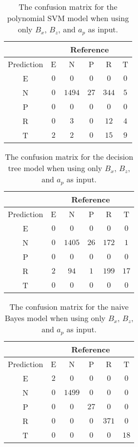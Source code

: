 \begin{table}[!ht]
	\centering
	\begin{tabular}{|c|c|c|c|c|c|}
		\hline
		 & \multicolumn{5}{|c|}{Reference} \\ \hline
		 Prediction & E & N & P & R & T \\ \hline
		 E & $0$ & $0$ & $0$ & $0$ & $0$ \\ \hline
		 N & $0$ & $1494$ & $27$ & $344$ & $5$ \\ \hline
		 P & $0$ & $0$ & $0$ & $0$ & $0$ \\ \hline
		 R & $0$ & $3$ & $0$ & $12$ & $4$ \\ \hline
		 T & $2$ & $2$ & $0$ & $15$ & $9$ \\ \hline
	\end{tabular}
	\caption{The confusion matrix for the polynomial SVM model when using only $B_{x}$, $B_{z}$, and $a_{p}$ as input.}
	\label{tab:cm:xzap:svmPoly}
\end{table}

\begin{table}[!ht]
	\centering
	\begin{tabular}{|c|c|c|c|c|c|}
		\hline
		 & \multicolumn{5}{|c|}{Reference} \\ \hline
		 Prediction & E & N & P & R & T \\ \hline
		 E & $0$ & $0$ & $0$ & $0$ & $0$ \\ \hline
		 N & $0$ & $1405$ & $26$ & $172$ & $1$ \\ \hline
		 P & $0$ & $0$ & $0$ & $0$ & $0$ \\ \hline
		 R & $2$ & $94$ & $1$ & $199$ & $17$ \\ \hline
		 T & $0$ & $0$ & $0$ & $0$ & $0$ \\ \hline
	\end{tabular}
	\caption{The confusion matrix for the decision tree model when using only $B_{x}$, $B_{z}$, and $a_{p}$ as input.}
	\label{tab:cm:xzap:C5.0}
\end{table}

\begin{table}[!ht]
	\centering
	\begin{tabular}{|c|c|c|c|c|c|}
		\hline
		 & \multicolumn{5}{|c|}{Reference} \\ \hline
		 Prediction & E & N & P & R & T \\ \hline
		 E & $2$ & $0$ & $0$ & $0$ & $0$ \\ \hline
		 N & $0$ & $1499$ & $0$ & $0$ & $0$ \\ \hline
		 P & $0$ & $0$ & $27$ & $0$ & $0$ \\ \hline
		 R & $0$ & $0$ & $0$ & $371$ & $0$ \\ \hline
		 T & $0$ & $0$ & $0$ & $0$ & $18$ \\ \hline
	\end{tabular}
	\caption{The confusion matrix for the naive Bayes model when using only $B_{x}$, $B_{z}$, and $a_{p}$ as input.}
	\label{tab:cm:xzap:nb}
\end{table}


